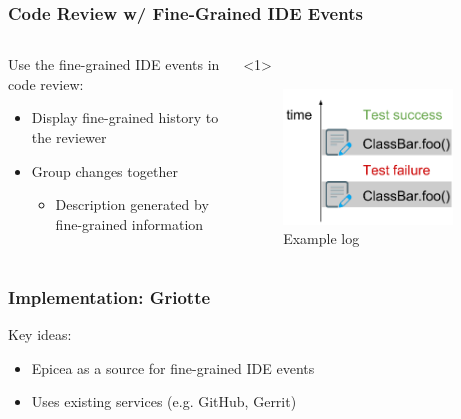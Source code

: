 \documentclass[aspectratio=169]{beamer}
\begin{document}
\begin{frame}[fragile]

\frametitle{Code Review w/ Fine-Grained IDE Events}

\begin{columns}

\begin{column}{0.5\textwidth}

Use the fine-grained IDE events in code review:

\begin{itemize}
\item<1-> Display fine-grained history to the reviewer
\item<2-> Group changes together
\begin{itemize}
\item<2-> Description generated by fine-grained information
\end{itemize}

\end{itemize}
\end{column}

\begin{column}{0.5\textwidth}

\begin{onlyenv}<1>
\begin{figure}
\begin{center}
\includegraphics[width=0.9\textwidth]{img/example_log.pdf}
\end{center}
\caption{Example log}
\end{figure}
\end{onlyenv}

\end{column}

\end{columns}

\end{frame}

\begin{frame}[fragile]

\frametitle{Implementation: Griotte}

Key ideas:

\begin{itemize}
\item Epicea as a source for fine-grained IDE events
\item Uses existing services (e.g. GitHub, Gerrit)
\end{itemize}
\end{frame}
\end{document}
